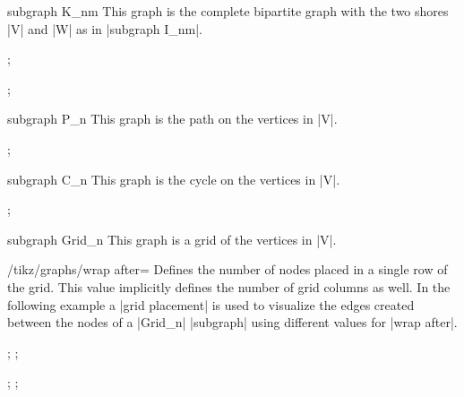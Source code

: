 \begin{graph}{subgraph K\_nm}
    This graph is the complete bipartite graph with the two shores |V| and |W|
    as in |subgraph I_nm|.
\begin{codeexample}[preamble={\usetikzlibrary{graphs.standard}}]
\tikz {};
\end{codeexample}
\begin{codeexample}[preamble={\usetikzlibrary{graphs.standard}}]
\tikz {};
\end{codeexample}
\end{graph}

\begin{graph}{subgraph P\_n}
    This graph is the path on the vertices in |V|.
\begin{codeexample}[preamble={\usetikzlibrary{graphs.standard}}]
\tikz {};
\end{codeexample}
\end{graph}

\begin{graph}{subgraph C\_n}
    This graph is the cycle on the vertices in |V|.
\begin{codeexample}[preamble={\usetikzlibrary{graphs.standard}}]
\tikz {};
\end{codeexample}
\end{graph}

\begin{graph}{subgraph Grid\_n}
    This graph is a grid of the vertices in |V|.
    \begin{key}{/tikz/graphs/wrap after=}
        Defines the number of nodes placed in a single row of the grid. This
        value implicitly defines the number of grid columns as well. In the
        following example a |grid placement| is used to visualize the edges
        created between the nodes of a |Grid_n| |subgraph| using different
        values for |wrap after|.
\begin{codeexample}[preamble={\usetikzlibrary{graphs.standard}}]
\tikz {};
\tikz {};
\end{codeexample}
\begin{codeexample}[preamble={\usetikzlibrary{graphs.standard}}]
\tikz {};
\tikz {};
\end{codeexample}
  \end{key}
\end{graph}


